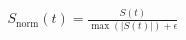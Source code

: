 \documentclass[preview]{standalone}
\begin{document}
\begin{align*}
S_{\text{norm}}(t) = \frac{S(t)}{\max(|S(t)|) + \epsilon}
\end{align*}
\end{document}

